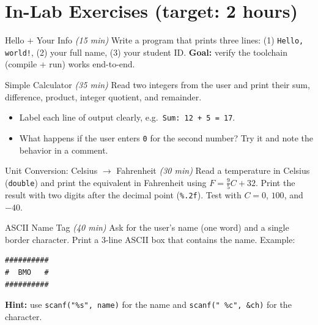 \documentclass[11pt]{article}
\begin{document}
\section*{In-Lab Exercises (target: 2 hours)}

\begin{labexercise}{Hello + Your Info \hfill {\small \itshape (15 min)}}
Write a program that prints three lines:
(1) \texttt{Hello, world!}, (2) your full name, (3) your student ID.
\textbf{Goal:} verify the toolchain (compile + run) works end-to-end.
\end{labexercise}

\begin{labexercise}{Simple Calculator \hfill {\small \itshape (35 min)}}
Read two integers from the user and print their sum, difference, product, integer quotient,
and remainder.
\begin{itemize}[leftmargin=*,nosep]
  \item Label each line of output clearly, e.g.\ \texttt{Sum: 12 + 5 = 17}.
  \item What happens if the user enters \texttt{0} for the second number? Try it and note the behavior in a comment.
\end{itemize}
\end{labexercise}

\begin{labexercise}{Unit Conversion: Celsius $\to$ Fahrenheit \hfill {\small \itshape (30 min)}}
Read a temperature in Celsius (\texttt{double}) and print the equivalent in Fahrenheit using
$F = \tfrac{9}{5}C + 32$. Print the result with two digits after the decimal point
(\texttt{\%.2f}). Test with $C = 0$, $100$, and $-40$.
\end{labexercise}

\begin{labexercise}{ASCII Name Tag \hfill {\small \itshape (40 min)}}
Ask for the user's name (one word) and a single border character. Print a 3-line
ASCII box that contains the name. Example:
\begin{lstlisting}
##########
#  BMO   #
##########
\end{lstlisting}
\textbf{Hint:} use \texttt{scanf("\%s", name)} for the name and \texttt{scanf(" \%c", \&ch)} for the character.
\end{labexercise}
\end{document}
